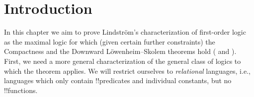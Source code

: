 \documentclass[../../../include/open-logic-section]{subfiles}
\begin{document}
\section{Introduction}

In this chapter we aim to prove Lindstr\"om's characterization of
first-order logic as the maximal logic for which (given certain
further constraints) the Compactness and the Downward
L\"owenheim--Skolem theorems hold
( and
). First, we need a more general
characterization of the general class of logics to which the theorem
applies. We will restrict ourselves to \emph{relational} languages,
i.e., languages which only contain !!{predicate}s and individual
constants, but no !!{function}s.
\end{document}
